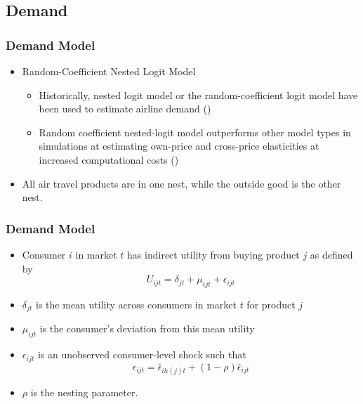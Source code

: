 \documentclass[xcolor=dvipsnames]{beamer}
\let\Oldsubsection\subsection
\renewcommand{\subsection}{\FloatBarrier\Oldsubsection}
\begin{document}
    \subsection{Demand}
    \begin{frame}
        \frametitle{Demand Model}
        \begin{itemize}
            \item Random-Coefficient Nested Logit Model 
            \begin{itemize}
                \item Historically, nested logit model or the random-coefficient logit model have been used to estimate airline demand 
                (\cite{turner_access_2022, ciliberto_market_2021, gayle_efficiency_2013, aguirregabiria_dynamic_2012, berry_airline_2006})
                \item Random coefficient nested-logit model outperforms other model types in simulations at estimating own-price and cross-price elasticities at increased computational costs (\cite{grigolon_nested_2014})
            \end{itemize}
            \item All air travel products are in one nest, while the outside good is the other nest. 
        \end{itemize}
    \end{frame}
    
    \begin{frame}
        \frametitle{Demand Model}
        \begin{itemize}
        \item  Consumer $i$ in market $t$ has indirect utility from buying product $j$ as defined by 
\[U_{ijt} = \delta_{jt} + \mu_{ijt} + \epsilon_{ijt}\]
        \item $\delta_{jt}$ is the mean utility across consumers in market $t$ for product $j$
		\item $\mu_{ijt}$ is the consumer's deviation from this mean utility
		\item  $\epsilon_{ijt}$ is an unobserved consumer-level shock such that \[\epsilon_{ijt} = \bar{\epsilon}_{ih(j)t} + (1 - \rho)\bar{\epsilon}_{ijt}\] 

        
		\item $\rho$ is the nesting parameter. 
        \end{itemize}
    \end{frame}
\end{document}
